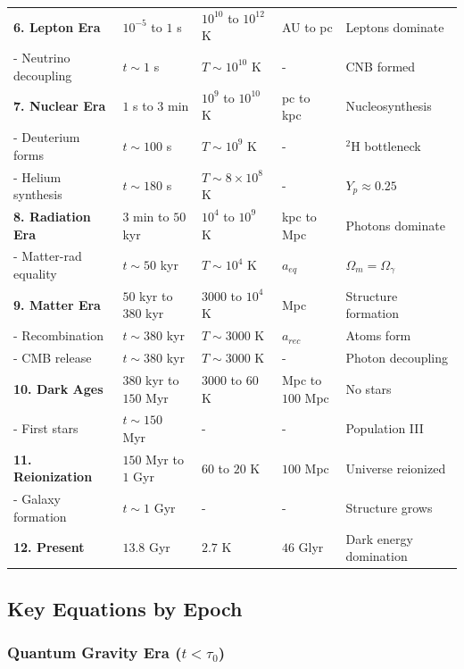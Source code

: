 \begin{table}[htbp]
\begin{tabular}{@{}lllll@{}}
\midrule
\textbf{6. Lepton Era} & $10^{-5}$ to $1$ s & $10^{10}$ to $10^{12}$ K & AU to pc & Leptons dominate \\
\quad - Neutrino decoupling & $t \sim 1$ s & $T \sim 10^{10}$ K & - & CNB formed \\
\midrule
\textbf{7. Nuclear Era} & $1$ s to $3$ min & $10^{9}$ to $10^{10}$ K & pc to kpc & Nucleosynthesis \\
\quad - Deuterium forms & $t \sim 100$ s & $T \sim 10^{9}$ K & - & $^2$H bottleneck \\
\quad - Helium synthesis & $t \sim 180$ s & $T \sim 8\times 10^{8}$ K & - & $Y_p \approx 0.25$ \\
\midrule
\textbf{8. Radiation Era} & $3$ min to $50$ kyr & $10^{4}$ to $10^{9}$ K & kpc to Mpc & Photons dominate \\
\quad - Matter-rad equality & $t \sim 50$ kyr & $T \sim 10^{4}$ K & $a_{eq}$ & $\Omega_m = \Omega_\gamma$ \\
\midrule
\textbf{9. Matter Era} & $50$ kyr to $380$ kyr & $3000$ to $10^{4}$ K & Mpc & Structure formation \\
\quad - Recombination & $t \sim 380$ kyr & $T \sim 3000$ K & $a_{rec}$ & Atoms form \\
\quad - CMB release & $t \sim 380$ kyr & $T \sim 3000$ K & - & Photon decoupling \\
\midrule
\textbf{10. Dark Ages} & $380$ kyr to $150$ Myr & $3000$ to $60$ K & Mpc to $100$ Mpc & No stars \\
\quad - First stars & $t \sim 150$ Myr & - & - & Population III \\
\midrule
\textbf{11. Reionization} & $150$ Myr to $1$ Gyr & $60$ to $20$ K & $100$ Mpc & Universe reionized \\
\quad - Galaxy formation & $t \sim 1$ Gyr & - & - & Structure grows \\
\midrule
\textbf{12. Present} & $13.8$ Gyr & $2.7$ K & $46$ Glyr & Dark energy domination \\
\bottomrule
\end{tabular}
\label{tab:cosmic_timeline}
\end{table}

\subsection{Key Equations by Epoch}

\subsubsection{Quantum Gravity Era ($t < \tau_0$)}

